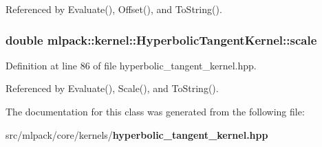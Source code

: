 Referenced by Evaluate(), Offset(), and To\-String().

\subsubsection[{scale}]{\setlength{\rightskip}{0pt plus 5cm}double mlpack\-::kernel\-::\-Hyperbolic\-Tangent\-Kernel\-::scale\hspace{0.3cm}{\ttfamily [private]}}\label{classmlpack_1_1kernel_1_1HyperbolicTangentKernel_ac7fc2bb9399ec5ebbbf1b45f5eb14f44}


Definition at line 86 of file hyperbolic\-\_\-tangent\-\_\-kernel.\-hpp.



Referenced by Evaluate(), Scale(), and To\-String().



The documentation for this class was generated from the following file\-:\begin{DoxyCompactItemize}
\item 
src/mlpack/core/kernels/{\bf hyperbolic\-\_\-tangent\-\_\-kernel.\-hpp}\end{DoxyCompactItemize}
